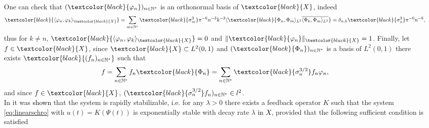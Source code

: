 \documentclass[11pt, dvipsnames]{amsart}
\begin{document}
One can check that $(\textcolor{black}{\varphi_{n}})_{n\in\mathbb{N}^{*}}$ is an orthonormal basis of $\textcolor{black}{X}$, indeed
\begin{equation}
\textcolor{black}{\langle \varphi_{n},\varphi_{k}\rangle_{\textcolor{black}{X}}} = \sum\limits_{m\in\mathbb{N}^{*}}\textcolor{black}{\sigma_{m}^{3}}\pi^{-6}n^{-3}k^{-3}
\langle \textcolor{black}{\Phi_{n},\Phi_{m}\rangle_{L^{2}}\overline{\langle \Phi_{k},\Phi_{m}\rangle_{L^{2}}}}
=\delta_{n,k}\textcolor{black}{\sigma_{n}^{3}}\pi^{-6}n^{-6},
\end{equation}
thus for $k\neq n$, $\textcolor{black}{\langle \varphi_{n},\varphi_{k}\rangle_{\textcolor{black}{X}}}=0$ and $\|\textcolor{black}{\varphi_{n}}\|_{\textcolor{black}{X}}=1$. Finally, let $f\in \textcolor{black}{X}$, since $\textcolor{black}{X}\subset L^{2}(0,1)$ and $(\textcolor{black}{\Phi_{n}})_{n\in\mathbb{N}^{*}}$ is a basis of $L^{2}(0,1)$ there exists $\textcolor{black}{(f_{n})_{n\in \mathbb{N}^{*}}}$ such that
\begin{equation}
f = \sum\limits_{n\in\mathbb{N}^{*}} f_{n} \textcolor{black}{\Phi_{n}} = \sum\limits_{n\in\mathbb{N}^{*}} \textcolor{black}{\sigma_{n}^{3/2}}f_{n} \varphi_{n},
\end{equation}
and since $f\in \textcolor{black}{X}$, $(\textcolor{black}{\sigma_{n}^{3/2}}f_{n})_{n\in \mathbb{N}^{*}}\in l^{2}$.\\




In \cite{Coron2018-rapid,nguyen2024rapid} it was \textcolor{black}{shown} 
that the system is rapidly stabilizable, i.e. for any $\lambda>0$ there exists a feedback operator $K$ such that the system \eqref{eq:linearschro} with $u(t) = K(\Psi(t))$ is exponentially stable with decay rate $\lambda$ \textcolor{black}{in $X$}, provided that the following sufficient condition is satisfied
\end{document}
